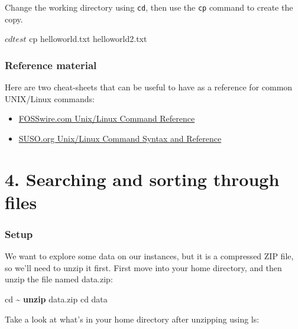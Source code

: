 \documentclass[
]{book}
\newenvironment{Shaded}{\begin{snugshade}}{\end{snugshade}}
\newcommand{\BuiltInTok}[1]{#1}
\newcommand{\ExtensionTok}[1]{#1}
\newcommand{\FunctionTok}[1]{\textcolor[rgb]{0.13,0.29,0.53}{\textbf{#1}}}
\newcommand{\NormalTok}[1]{#1}
\providecommand{\tightlist}{%
  \setlength{\itemsep}{0pt}\setlength{\parskip}{0pt}}
\begin{document}
Change the working directory using \texttt{cd}, then use the \texttt{cp} command to create the copy.

\begin{Shaded}
\begin{Highlighting}[]
\ExtensionTok{$}\NormalTok{ cd test}
\ExtensionTok{$}\NormalTok{ cp helloworld.txt helloworld2.txt}
\end{Highlighting}
\end{Shaded}

\subsection{Reference material}\label{reference-material}

Here are two cheat-sheets that can be useful to have as a reference for common UNIX/Linux commands:

\begin{itemize}
\tightlist
\item
  \href{https://files.fosswire.com/2007/08/fwunixref.pdf}{FOSSwire.com Unix/Linux Command Reference}
\item
  \href{https://i.redd.it/6s2q64ticje51.png}{SUSO.org Unix/Linux Command Syntax and Reference}
\end{itemize}

\chapter{4. Searching and sorting through files}\label{searching-and-sorting-through-files}

\subsection{Setup}\label{setup}

We want to explore some data on our instances, but it is a compressed ZIP file, so we'll need to unzip it first. First move into your home directory, and then unzip the file named data.zip:

\begin{Shaded}
\begin{Highlighting}[]
\BuiltInTok{cd}\NormalTok{ \textasciitilde{}}
\FunctionTok{unzip}\NormalTok{ data.zip}
\BuiltInTok{cd}\NormalTok{ data}
\end{Highlighting}
\end{Shaded}

Take a look at what's in your home directory after unzipping using ls:
\end{document}
